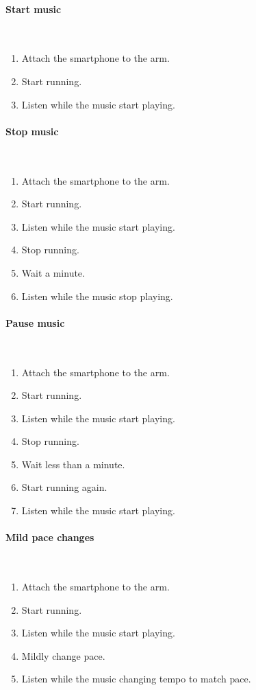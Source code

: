 \paragraph{Start music}~\\ 
\begin{enumerate}
	\item Attach the smartphone to the arm.
	\item Start running.
	\item Listen while the music start playing.
\end{enumerate} 

\paragraph{Stop music}~\\
\begin{enumerate}
	\item Attach the smartphone to the arm.
	\item Start running.
	\item Listen while the music start playing.
	\item Stop running.
	\item Wait a minute.
	\item Listen while the music stop playing.
\end{enumerate} 

\paragraph{Pause music}~\\
\begin{enumerate}
	\item Attach the smartphone to the arm.
	\item Start running.
	\item Listen while the music start playing.
	\item Stop running.
	\item Wait less than a minute.
	\item Start running again.
	\item Listen while the music start playing.
\end{enumerate} 

\paragraph{Mild pace changes}~\\
\begin{enumerate}
	\item Attach the smartphone to the arm.
	\item Start running.
	\item Listen while the music start playing.
	\item Mildly change pace.
	\item Listen while the music changing tempo to match pace.
\end{enumerate} 

